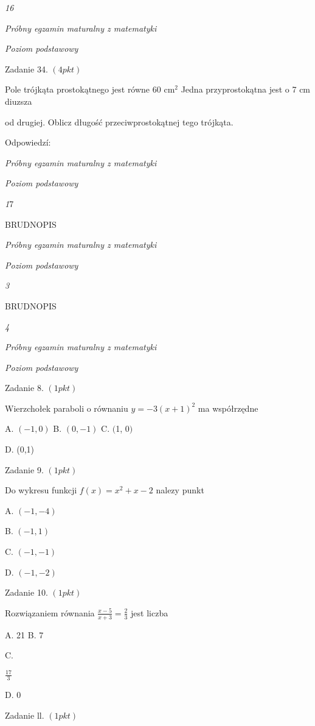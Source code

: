 \documentclass[a4paper,12pt]{article}
\begin{document}
{\it 16}

{\it Próbny egzamin maturalny z matematyki}

{\it Poziom podstawowy}

Zadanie 34. $(4pkt)$

Pole trójkąta prostokątnego jest równe 60 $\mathrm{c}\mathrm{m}^{2}$ Jedna przyprostokątna jest o 7 cm diuzsza

od drugiej. Oblicz długość przeciwprostokątnej tego trójkąta.

Odpowiedzí:





{\it Próbny egzamin maturalny z matematyki}

{\it Poziom podstawowy}

{\it 1}7

BRUDNOPIS





{\it Próbny egzamin maturalny z matematyki}

{\it Poziom podstawowy}

{\it 3}

BRUDNOPIS





{\it 4}

{\it Próbny egzamin maturalny z matematyki}

{\it Poziom podstawowy}

Zadanie 8. $(1pkt)$

Wierzchołek paraboli o równaniu $y=-3(x+1)^{2}$ ma współrzędne

A. $(-1,0)$ B. $(0,-1)$ C. $($1, $0)$

D. (0,1)

Zadanie 9. $(1pkt)$

Do wykresu funkcji $f(x)=x^{2}+x-2$ nalezy punkt

A. $(-1,-4)$

B. $(-1,1)$

C. $(-1,-1)$

D. $(-1,-2)$

Zadanie 10. $(1pkt)$

Rozwiązaniem równania $\displaystyle \frac{x-5}{x+3}=\frac{2}{3}$ jest liczba

A. 21 B. 7

C.

$\displaystyle \frac{17}{3}$

D. 0

Zadanie ll. $(1pkt)$
\end{document}
